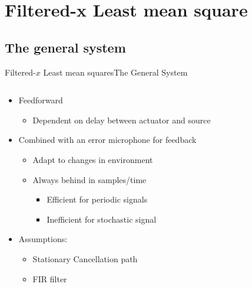 \section{Filtered-x Least mean square}


\subsection{The general system}
\begin{frame}{Filtered-$x$ Least mean squares}{The General System}
	\begin{columns}
		\begin{column}{0.5\textwidth}		

		\begin{itemize}
		\item Feedforward
		\begin{itemize}
		\item Dependent on delay between actuator and source		
		\end{itemize}
		\item Combined with an error microphone for feedback
		\begin{itemize}
		\item Adapt to changes in environment
		\item Always behind in samples/time 		
		\begin{itemize}
		\item Efficient for periodic signals
		\item Inefficient for stochastic signal 
		\end{itemize}	
		\end{itemize}
		\item Assumptions:
		\begin{itemize}
		\item Stationary Cancellation path
		\item FIR filter
		\end{itemize}

		\end{itemize}

		
		\end{column}
		\begin{column}{0.5\textwidth}
		\resizebox{1.1\columnwidth}{!}{	
		
		}
		\end{column}
	\end{columns}
\end{frame}


